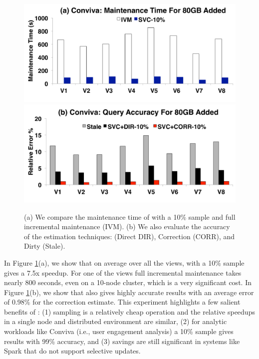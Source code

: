 \begin{figure}[t]
\centering
 \includegraphics[scale=0.16]{figs/con_3.pdf}
 \includegraphics[scale=0.16]{figs/con_4.pdf} \vspace{-1.5em}
 \caption{(a) We compare the maintenance time of \svc with a 10\% sample and full incremental maintenance (IVM). (b) We also evaluate the accuracy of the estimation techniques: (Direct DIR), Correction (CORR), and Dirty (Stale). \label{conv-1}}\vspace{-1.5em}
\end{figure}

In Figure \ref{conv-1}(a), we show that on average over all the views, \svc with a 10\% sample gives a 7.5x speedup.
For one of the views full incremental maintenance takes nearly 800 seconds, even on a 10-node cluster, which is a very significant cost.
In Figure \ref{conv-1}(b), we show that \svc also gives highly accurate results with an average error of 0.98\% for the correction estimate.
This experiment highlights a few salient benefits of \svc: (1) sampling is a relatively cheap operation and the relative speedups in a single node and distributed environment are similar, (2) for analytic workloads like Conviva (i.e., user engagement analysis) a 10\% sample gives results with 99\% accuracy, and (3) savings are still significant in systems like Spark that do not support selective updates.

